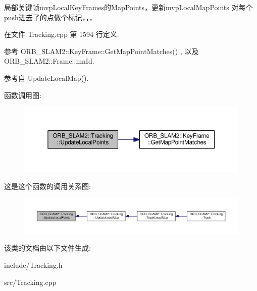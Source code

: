 局部关键帧mvp\-Local\-Key\-Frames的\-Map\-Points，更新mvp\-Local\-Map\-Points 对每个push进去了的点做个标记，，， 

在文件 Tracking.\-cpp 第 1594 行定义.



参考 O\-R\-B\-\_\-\-S\-L\-A\-M2\-::\-Key\-Frame\-::\-Get\-Map\-Point\-Matches() , 以及 O\-R\-B\-\_\-\-S\-L\-A\-M2\-::\-Frame\-::mn\-Id.



参考自 Update\-Local\-Map().



函数调用图\-:
\nopagebreak
\begin{figure}[H]
\begin{center}
\leavevmode
\includegraphics[width=350pt]{classORB__SLAM2_1_1Tracking_a25843575116bf18c065d6cc7645f5b26_cgraph}
\end{center}
\end{figure}




这是这个函数的调用关系图\-:
\nopagebreak
\begin{figure}[H]
\begin{center}
\leavevmode
\includegraphics[width=350pt]{classORB__SLAM2_1_1Tracking_a25843575116bf18c065d6cc7645f5b26_icgraph}
\end{center}
\end{figure}




该类的文档由以下文件生成\-:\begin{DoxyCompactItemize}
\item 
include/Tracking.\-h\item 
src/Tracking.\-cpp\end{DoxyCompactItemize}
